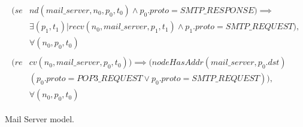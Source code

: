 \begin{figure}[h]
{\begin{subequations}
\begin{align}
				\begin{split}
					\label{mail-server_constr3}
					(se& nd(mail\_server , n_{0}, p_{0}, t_{0}) \wedge p_{0}.proto = SMTP\_RESPONSE) \implies \\
					& \exists (p_{1}, t_{1}) | recv(n_{0}, mail\_server, p_{1}, t_{1}) \wedge  p_{1}.proto = SMTP\_REQUEST),\\
					& \forall (n_{0}, p_{0}, t_{0})
				\end{split} \\
				\begin{split}
					\label{mail-server_constr4}
					(re& cv(n_{0}, mail\_server, p_{0}, t_{0})) \implies  (nodeHasAddr(mail\_server, p_{0}.dst) \\
					& (p_{0}.proto = POP3\_REQUEST \vee p_{0}.proto = SMTP\_REQUEST)), \\
					& \forall (n_{0}, p_{0}, t_{0})
				\end{split}
			\end{align}
		\end{subequations}
	}%
	\caption{Mail Server model.}
	\label{mail-server_model}
\end{figure}

